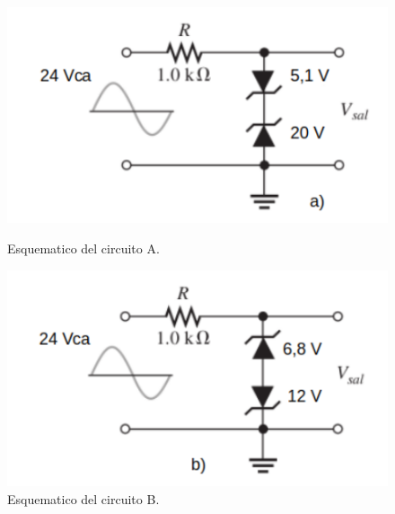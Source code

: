\documentclass[chaptersright]{informeutn}
\begin{document}
 
    \begin{figure}[H]
        \centering
 \begin{minipage}{0.46\textwidth}
    \centering
        \includegraphics[width=\textwidth]{pictures/Esquematico_circuito_a.png}
        \caption{Esquematico del circuito A.}
    \end{minipage}
\hspace{0.05\textwidth}
\begin{minipage}{0.46\textwidth}
    \centering
        \includegraphics[width=\textwidth]{pictures/Esquematico_circuito_B.png}
        \caption{Esquematico del circuito B.}
    \end{minipage}
    \end{figure}
\end{document}
